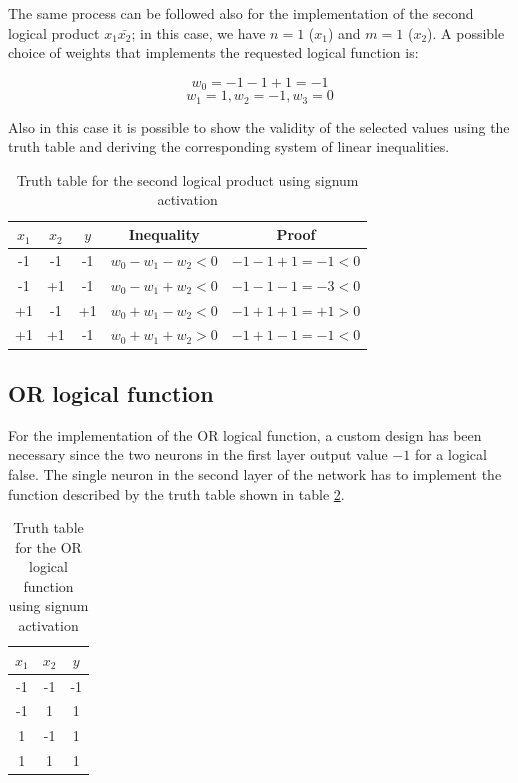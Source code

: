 \documentclass[letterpaper,headings=standardclasses]{scrartcl}
\begin{document}
The same process can be followed also for the implementation of the second logical product $ x_1 \bar{x_2} $; in this case, we have $ n = 1 $ ($x_1$) and $ m = 1 $ ($x_2$). A possible choice of weights that implements the requested logical function is:

$$ w_0 = -1 -1 + 1 = -1 $$
$$ w_1 = 1, w_2 = -1, w_3 = 0 $$

Also in this case it is possible to show the validity of the selected values using the truth table and deriving the corresponding system of linear inequalities.

\begin{table}[h]
\centering
\begin{tabular}{|c|c|c|c|c|}
\hline
$x_1$ & $x_2$ & $y$ & Inequality & Proof \\ \hline
-1    & -1    & -1  & $w_0-w_1-w_2<0$ & $-1-1+1=-1<0$ \\ \hline
-1    & +1    & -1  & $w_0-w_1+w_2<0$ & $-1-1-1=-3<0$ \\ \hline
+1    & -1    & +1  & $w_0+w_1-w_2<0$ & $-1+1+1=+1>0$ \\ \hline
+1    & +1    & -1  & $w_0+w_1+w_2>0$ & $-1+1-1=-1<0$ \\ \hline
\end{tabular}
\caption{Truth table for the second logical product using signum activation}
\label{truth_prod2}
\end{table}

\subsection{OR logical function}

For the implementation of the OR logical function, a custom design has been necessary since the two neurons in the first layer output value $-1$ for a logical false. The single neuron in the second layer of the network has to implement the function described by the truth table shown in table \ref{truth_or}.

\begin{table}[h]
\centering
\begin{tabular}{|c|c|c|}
\hline
$x_1$ & $x_2$ & $y$ \\ \hline
-1    & -1    & -1  \\ \hline
-1    & 1     & 1   \\ \hline
1     & -1    & 1   \\ \hline
1     & 1     & 1   \\ \hline
\end{tabular}
\caption{Truth table for the OR logical function using signum activation}
\label{truth_or}
\end{table}
\end{document}

